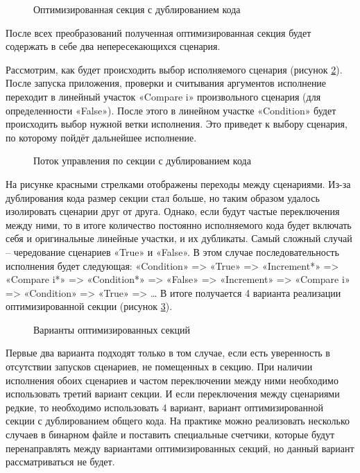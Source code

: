 \begin{figure}[!h]
    \centerfloat{
        \texttt{[image: \_6]}
    }
    \caption{Оптимизированная секция с дублированием кода}\label{fig:CFGProfile4}
\end{figure}
После всех преобразований полученная оптимизированная секция будет содержать в себе два непересекающихся сценария.

Рассмотрим, как будет происходить выбор исполняемого сценария (рисунок \cref{fig:CFGSec1}). После запуска приложения, проверки и считывания аргументов исполнение переходит в линейный участок «Compare i» произвольного сценария (для определенности «False»). После этого в линейном участке «Condition» будет происходить выбор нужной ветки исполнения. Это приведет к выбору сценария, по которому пойдёт дальнейшее исполнение.

 
\begin{figure}[!h]
    \centerfloat{
        \texttt{[image: \_7]}
    }
    \caption{Поток управления по секции с дублированием кода}\label{fig:CFGSec1}
\end{figure}
На рисунке красными стрелками отображены переходы между сценариями. Из-за дублирования кода размер секции стал больше, но таким образом удалось изолировать сценарии друг от друга. Однако, если будут частые переключения между ними, то в итоге количество постоянно исполняемого кода будет включать себя и оригинальные линейные участки, и их дубликаты. Самый сложный случай – чередование сценариев «True» и «False». В этом случае последовательность исполнения будет следующая:
«Condition» => «True» => «Increment*» => «Compare i*» => «Condition*» => «False» => «Increment» => «Compare i» => «Condition» => «True» => …
В итоге получается 4 варианта реализации оптимизированной секции (рисунок \cref{fig:CFGSec2}).
 
\begin{figure}[!h]
    \centerfloat{
        \texttt{[image: \_8]}
    }
    \caption{Варианты оптимизированных секций}\label{fig:CFGSec2}
\end{figure}
Первые два варианта подходят только в том случае, если есть уверенность в отсутствии запусков сценариев, не помещенных в секцию. При наличии исполнения обоих сценариев и частом переключении между ними необходимо использовать третий вариант секции. И если переключения между сценариями редкие, то необходимо использовать 4 вариант, вариант оптимизированной секции с дублированием общего кода.
На практике можно реализовать несколько случаев в бинарном файле и поставить специальные счетчики, которые будут перенаправлять между вариантами оптимизированных секций, но данный вариант рассматриваться не будет.


